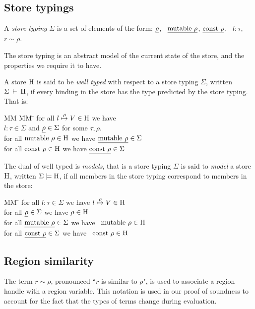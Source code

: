 \clearpage{}
\subsection{Store typings}
\label{Core:Simplified:StoreTypings}

A \emph{store typing} $\Sigma$ is a set of elements of the form:
$\underline{\rho}$, \ $\underline{\textrm{mutable} \ \rho}$, $\underline{\textrm{const} \ \rho}$, \ $l : \tau$, \ $r \sim \rho$.

The store typing is an abstract model of the current state of the store, and the properties we require it to have. 

A store $\textrm{H}$ is said to be \emph{well typed} with respect to a store typing $\Sigma$, 
written $\Sigma \hspace{2pt} \boldsymbol{\vdash} \hspace{2pt} \textrm{H}$, if every binding in the store has the type predicted by the store typing. That is:
\begin{tabbing}
MM \= MM \= \kill
	\> for all $l \stackrel{\rho}{\mapsto} V \in \textrm{H}$ we have \\
	\> \> $l : \tau \in \Sigma$ 
		and $\underline{\rho} \in \Sigma$
		for some $\tau, \rho$. 
\\[1ex]
	\> for all $\textrm{mutable} \ \rho \in \textrm{H}$ we have $\underline{\textrm{mutable} \ \rho} \in \Sigma$ 
\\[1ex]
	\> for all 	$\textrm{const} \ \rho \in \textrm{H}$ we have $\underline{\textrm{const} \ \rho} \in \Sigma$
\end{tabbing}


The dual of well typed is \emph{models}, that is a store typing $\Sigma$ is said to \emph{model} a store $\textrm{H}$, 
written $\Sigma \models \textrm{H}$, if all members in the store typing correspond to members in the store:
\begin{tabbing}
MM \= \kill
	\> for all $l : \tau \in \Sigma$ we have $l \stackrel{\rho}{\mapsto} V \in \textrm{H}$ 
\\[1ex]
	\> for all $\underline{\rho} \in \Sigma$ we have $\rho \in \textrm{H}$ 
\\[1ex]
	\> for all $\underline{\textrm{mutable} \ \rho} \in \Sigma$ we have \ $\textrm{mutable} \ \rho \in \textrm{H}$ 
\\[1ex]
	\> for all $\underline{\textrm{const} \ \rho} \in \Sigma$ we have   \ $\textrm{const} \ \rho \in \textrm{H}$ 
\end{tabbing}


\clearpage{}
\subsection{Region similarity}
The term $r \sim \rho$, pronounced ``$r$ is similar to $\rho$", is used to associate a region handle with a region variable. This notation is used in our proof of soundness to account for the fact that the types of terms change during evaluation.

